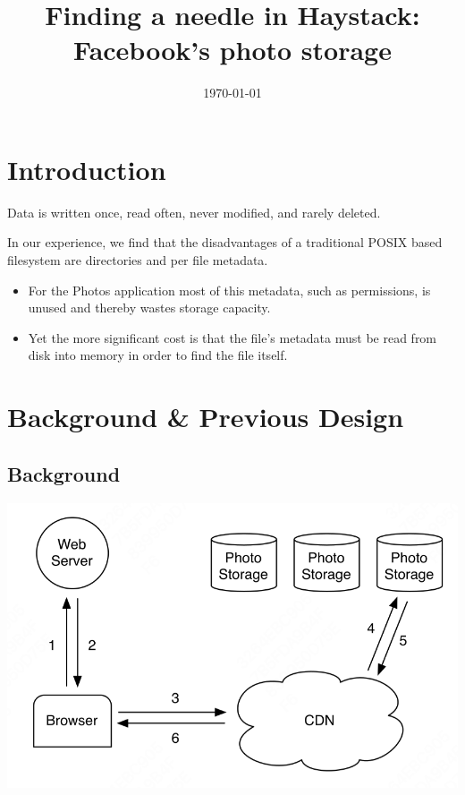 \documentclass[11pt]{article}
\date{\today}
\title{Finding a needle in Haystack: Facebook's photo storage}
\begin{document}
\maketitle
\section{Introduction}
\label{sec:org8bc8db7}
Data is written once, read often, never modified, and rarely deleted.

In our experience, we find that the disadvantages of a traditional POSIX based filesystem are
directories and per file metadata.
\begin{itemize}
\item For the Photos application most of this metadata, such as permissions, is unused and thereby wastes
storage capacity.
\item Yet the more significant cost is that the file’s metadata must be read from disk into memory in
order to find the file itself.
\end{itemize}
\section{Background \& Previous Design}
\label{sec:orgbb2da0f}
\subsection{Background}
\label{sec:org644e6f1}
\begin{center}
\includegraphics[width=.8\textwidth]{../../images/papers/132.png}
\end{center}
\end{document}
